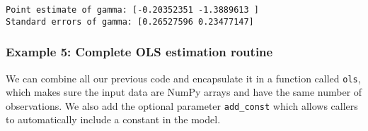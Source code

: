 \documentclass[10pt]{scrartcl}
\begin{document}
    \begin{Verbatim}[commandchars=\\\{\}]
Point estimate of gamma: [-0.20352351 -1.3889613 ]
Standard errors of gamma: [0.26527596 0.23477147]
    \end{Verbatim}

    \hypertarget{example-5-complete-ols-estimation-routine}{%
\subsubsection{Example 5: Complete OLS estimation
routine}\label{example-5-complete-ols-estimation-routine}}

We can combine all our previous code and encapsulate it in a function
called \texttt{ols}, which makes sure the input data are NumPy arrays
and have the same number of observations. We also add the optional
parameter \texttt{add\_const} which allows callers to automatically
include a constant in the model.
\end{document}
